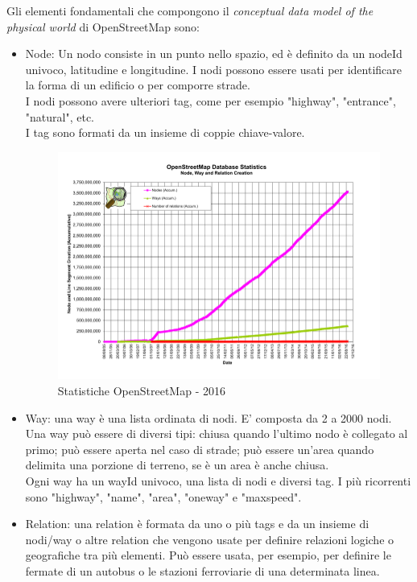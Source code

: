 \documentclass[12pt,a4paper,openright,twoside]{report}
\begin{document}
Gli elementi fondamentali che compongono il \textit{conceptual data model of the physical world} di OpenStreetMap sono:
\begin{itemize}
\item Node: Un nodo consiste in un punto nello spazio, ed è definito da un nodeId univoco, latitudine e longitudine. I nodi possono essere usati per identificare la forma di un edificio o per comporre strade.\\
I nodi possono avere ulteriori tag, come per esempio "highway", "entrance", "natural", etc.\\
I tag sono formati da un insieme di coppie chiave-valore. \\

\begin{figure}[h] 
\centering 
\includegraphics[scale=1]{fig3} 
\caption{Statistiche OpenStreetMap - 2016} 
\end{figure}
\item Way: una way è una lista ordinata di nodi. E' composta da 2 a 2000 nodi. Una way può essere di diversi tipi: chiusa quando l'ultimo nodo è collegato al primo; può essere aperta nel caso di strade; può essere un'area quando delimita una porzione di terreno, se è un area è anche chiusa.\\
Ogni way ha un wayId univoco, una lista di nodi e diversi tag. I più ricorrenti sono "highway", "name", "area", "oneway" e "maxspeed".
\item Relation: una relation è formata da uno o più tags e da un insieme di nodi/way o altre relation che vengono usate per definire relazioni logiche o geografiche tra più elementi. Può essere usata, per esempio, per definire le fermate di un autobus o le stazioni ferroviarie di una determinata linea.
\end{itemize}
\newpage
\end{document}
